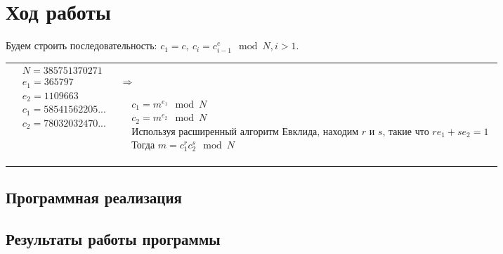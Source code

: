 \documentclass[a4paper, 14pt]{report}
\begin{document}
\chapter*{Ход работы}
{}
Будем строить последовательность:
$c_1 = c, ~c_i = c_{i-1}^{e} \mod N, i > 1$.
\begin{center}
    \begin{tabularx}{\textwidth}{p{}|X}
        $\begin{aligned}
                  & N = 385751370271     \\
                  & e_1 = 365797         \\
                  & e_2 = 1109663        \\
                  & c_1 = 58541562205... \\
                  & c_2 = 78032032470... \\
             \end{aligned}$ &
        \begin{minipage}{1em}
            $\Rightarrow$
        \end{minipage}
        $\begin{aligned}
                  & c_1 = m^{e_1} \mod N                                                                                         \\
                  & c_2 = m^{e_2} \mod N                                                                                         \\
                  & \text{Используя расширенный алгоритм Евклида, находим } r \text{ и } s \text{, такие что } r e_1 + s e_2 = 1 \\
                  & \text{Тогда } m = c_1^r c_2^s \mod N
             \end{aligned}$
    \end{tabularx}
\end{center}

\section*{Программная реализация}
{}





\section*{Результаты работы программы}
{}
\end{document}
